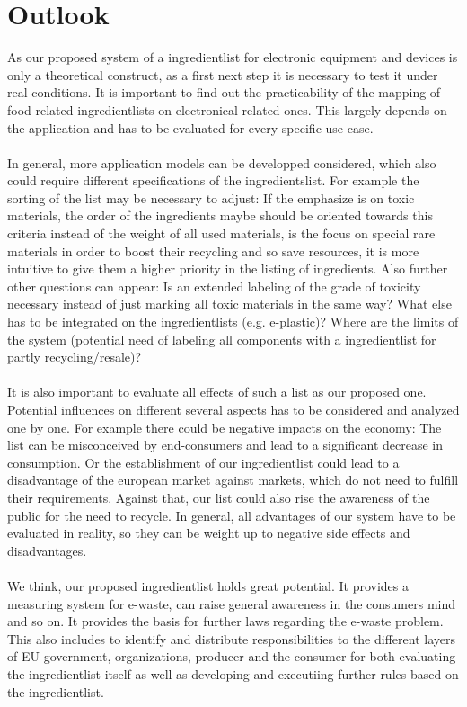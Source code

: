 \section{Outlook}
As our proposed system of a ingredientlist for electronic equipment and devices is only a theoretical construct, as a first next step it is necessary to test it under real conditions. It is important to find out the practicability of the mapping of food related ingredientlists on electronical related ones. This largely depends on the application and has to be evaluated for every specific use case.\\
\\
In general, more application models can be developped considered, which also could require different specifications of the ingredientslist. For example the sorting of the list may be necessary to adjust: If the emphasize is on toxic materials, the order of the ingredients maybe should be oriented towards this criteria instead of the weight of all used materials, is the focus on special rare materials in order to boost their recycling and so save resources, it is more intuitive to give them a higher priority in the listing of ingredients. Also further other questions can appear: Is an extended labeling of the grade of toxicity necessary instead of just marking all toxic materials in the same way? What else has to be integrated on the ingredientlists (e.g. e-plastic)? Where are the limits of the system (potential need of labeling all components with a ingredientlist for partly recycling/resale)?\\
\\
It is also important to evaluate all effects of such a list as our proposed one. Potential influences on different several aspects has to be considered and analyzed one by one. For example there could be negative impacts on the economy: The list can be misconceived by end-consumers and lead to a significant decrease in consumption. Or the establishment of our ingredientlist could lead to a disadvantage of the european market against markets, which do not need to fulfill their requirements. Against that, our list could also rise the awareness of the public for the need to recycle. In general, all advantages of our system have to be evaluated in reality, so they can be weight up to negative side effects and disadvantages.\\
\\
We think, our proposed ingredientlist holds great potential. It provides a measuring system for e-waste, can raise general awareness in the consumers mind and so on. It provides the basis for further laws regarding the e-waste problem. This also includes to identify and distribute responsibilities to the different layers of EU government, organizations, producer and the consumer for both evaluating the ingredientlist itself as well as developing and executiing further rules based on the ingredientlist.\\
